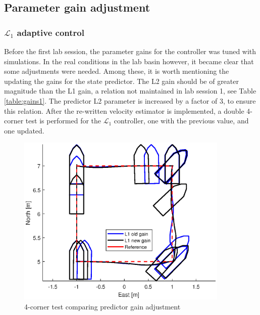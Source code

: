 \newpage
\subsection{Parameter gain adjustment}

\subsubsection{$\mathcal{L}_1$ adaptive control}

Before the first lab session, the parameter gains for the controller was tuned with simulations. In the real conditions in the lab basin however, it became clear that some adjustments were needed. Among these, it is worth mentioning the updating the gains for the state predictor. The L2 gain should be of greater magnitude than the L1 gain, a relation not maintained in lab session 1, see Table \ref{table:gains1}. The predictor L2 parameter is increased by a factor of 3, to ensure this relation. After the re-written velocity estimator is implemented, a double 4-corner test is performed for the $\mathcal{L}_1$ controller, one with the previous value, and one updated. 

\begin{figure}[h!]
\centering
\includegraphics[width=0.9\textwidth]{adjustment_plots/4cornerimprovement.eps}
\caption{4-corner test comparing predictor gain adjustment}
\label{fig:4corner_newL2}
\end{figure}




